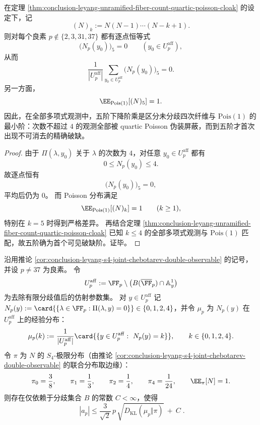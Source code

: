 \begin{corollary}[五阶下降阶乘是首个可见破缺阶]\label{cor:conclusion-leyang-fifth-falling-factorial-first-visible-break}
在定理 \ref{thm:conclusion-leyang-unramified-fiber-count-quartic-poisson-cloak} 的设定下，记
\[
(N)_k:=N(N-1)\cdots (N-k+1).
\]
则对每个良素 \(p\notin \{2,3,31,37\}\) 都有逐点恒等式
\[
\bigl(N_p(y_0)\bigr)_5=0
\qquad (y_0\in U_p^{\mathrm{aff}}),
\]
从而
\[
\frac{1}{|U_p^{\mathrm{aff}}|}
\sum_{y_0\in U_p^{\mathrm{aff}}}\bigl(N_p(y_0)\bigr)_5=0.
\]
另一方面，
\[
\EE_{\mathrm{Pois}(1)}[(N)_5]=1.
\]
因此，在全部多项式观测中，五阶下降阶乘是区分未分歧四次纤维与 \(\mathrm{Pois}(1)\) 的最小阶：次数不超过 \(4\) 的观测全部被 quartic Poisson 伪装屏蔽，而到五阶才首次出现不可消去的精确破缺。
\end{corollary}
\begin{proof}
由于 \(\Pi(\lambda,y_0)\) 关于 \(\lambda\) 的次数为 \(4\)，对任意 \(y_0\in U_p^{\mathrm{aff}}\) 都有
\[
0\le N_p(y_0)\le 4.
\]
故逐点恒有
\[
\bigl(N_p(y_0)\bigr)_5=0,
\]
平均后仍为 \(0\)。
而 Poisson 分布满足
\[
\EE_{\mathrm{Pois}(1)}[(N)_k]=1
\qquad (k\ge 1),
\]
特别在 \(k=5\) 时得到严格差异。
再结合定理 \ref{thm:conclusion-leyang-unramified-fiber-count-quartic-poisson-cloak} 已知 \(k\le 4\) 的全部多项式观测与 \(\mathrm{Pois}(1)\) 匹配，故五阶确为首个可见破缺阶。证毕。
\end{proof}

\begin{theorem}\label{thm:conclusion-leyang-hecke-trace-kl-bound}
沿用推论 \ref{cor:conclusion-leyang-s4-joint-chebotarev-double-observable} 的记号，并设 \(p\neq 37\) 为良素。
令
\[
U_p^{\mathrm{aff}}:=\FF_p\setminus \bigl(B(\overline{\FF}_p)\cap \mathbb A^1_y\bigr)
\]
为去除有限分歧值后的仿射参数集。
对 \(y\in U_p^{\mathrm{aff}}\) 记
\(
N_p(y):=\card{\{\lambda\in\FF_p:\Pi(\lambda,y)=0\}}\in\{0,1,2,4\}
\)，并令 \(\mu_p\) 为 \(N_p(y)\) 在 \(U_p^{\mathrm{aff}}\) 上的经验分布：
\[
\mu_p(k):=\frac{1}{|U_p^{\mathrm{aff}}|}\card{\{y\in U_p^{\mathrm{aff}}:\ N_p(y)=k\}},
\qquad k\in\{0,1,2,4\}.
\]
令 \(\pi\) 为 \(N\) 的 \(S_4\)-极限分布（由推论 \ref{cor:conclusion-leyang-s4-joint-chebotarev-double-observable} 的联合分布取边缘）：
\[
\pi_0=\frac{3}{8},\qquad
\pi_1=\frac{1}{3},\qquad
\pi_2=\frac{1}{4},\qquad
\pi_4=\frac{1}{24},
\qquad
\EE_\pi[N]=1.
\]
则存在仅依赖于分歧集合 \(B\) 的常数 \(C<\infty\)，使得
\[
\boxed{\;
|a_p|
\le
\frac{3}{\sqrt 2}\,p\,\sqrt{D_{\mathrm{KL}}(\mu_p\Vert \pi)}
\ +\ C\; }.
\]
\end{theorem}

